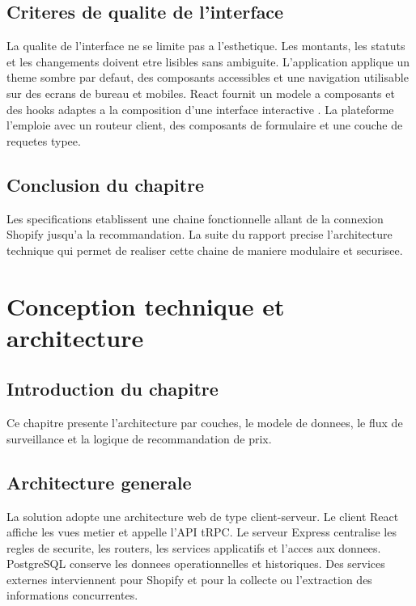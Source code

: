 \documentclass[12pt,a4paper,oneside]{report}
\begin{document}
\section{Criteres de qualite de l'interface}
La qualite de l'interface ne se limite pas a l'esthetique. Les montants, les statuts et les changements doivent etre lisibles sans ambiguite. L'application applique un theme sombre par defaut, des composants accessibles et une navigation utilisable sur des ecrans de bureau et mobiles. React fournit un modele a composants et des hooks adaptes a la composition d'une interface interactive \cite{react}. La plateforme l'emploie avec un routeur client, des composants de formulaire et une couche de requetes typee.

\section*{Conclusion du chapitre}
Les specifications etablissent une chaine fonctionnelle allant de la connexion Shopify jusqu'a la recommandation. La suite du rapport precise l'architecture technique qui permet de realiser cette chaine de maniere modulaire et securisee.
\clearpage

\chapter{Conception technique et architecture}
\section*{Introduction du chapitre}
Ce chapitre presente l'architecture par couches, le modele de donnees, le flux de surveillance et la logique de recommandation de prix.

\section{Architecture generale}
La solution adopte une architecture web de type client-serveur. Le client React affiche les vues metier et appelle l'API tRPC. Le serveur Express centralise les regles de securite, les routers, les services applicatifs et l'acces aux donnees. PostgreSQL conserve les donnees operationnelles et historiques. Des services externes interviennent pour Shopify et pour la collecte ou l'extraction des informations concurrentes.
\end{document}
